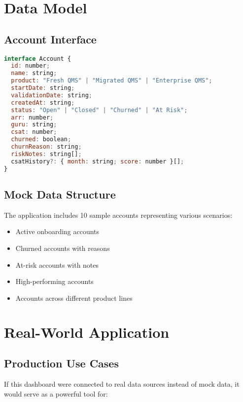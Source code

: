 \documentclass[12pt,a4paper]{article}
\begin{document}
\section{Data Model}

\subsection{Account Interface}

\begin{lstlisting}[language=JavaScript, caption=Account Data Structure]
interface Account {
  id: number;
  name: string;
  product: "Fresh QMS" | "Migrated QMS" | "Enterprise QMS";
  startDate: string;
  validationDate: string;
  createdAt: string;
  status: "Open" | "Closed" | "Churned" | "At Risk";
  arr: number;
  guru: string;
  csat: number;
  churned: boolean;
  churnReason: string;
  riskNotes: string[];
  csatHistory?: { month: string; score: number }[];
}
\end{lstlisting}

\subsection{Mock Data Structure}

The application includes 10 sample accounts representing various scenarios:
\begin{itemize}
    \item Active onboarding accounts
    \item Churned accounts with reasons
    \item At-risk accounts with notes
    \item High-performing accounts
    \item Accounts across different product lines
\end{itemize}

\section{Real-World Application}

\subsection{Production Use Cases}

If this dashboard were connected to real data sources instead of mock data, it would serve as a powerful tool for:
\end{document}
